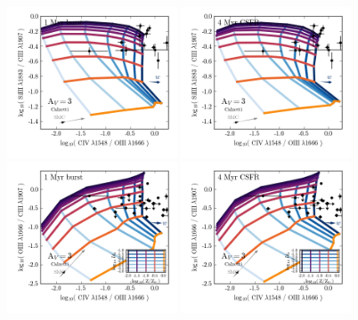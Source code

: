 \documentclass[preprint2]{aastex61}
\begin{document}
 
\begin{figure}
  \begin{center}
    \includegraphics[width=0.45\textwidth]{figs/f16a.png}
    \includegraphics[width=0.45\textwidth]{figs/f16b.png}\\
    \includegraphics[width=0.45\textwidth]{figs/f16c.png}
    \includegraphics[width=0.45\textwidth]{figs/f16d.png}

\end{center}
\end{figure}
\end{document}
